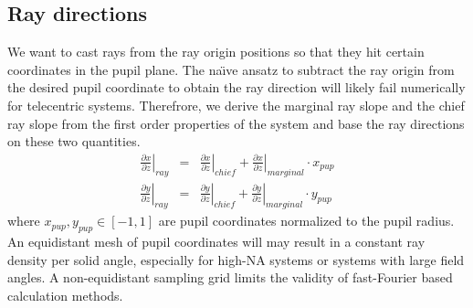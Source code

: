 \documentclass[12pt,a4paper,twoside,openright,BCOR10mm,headsepline,titlepage,abstracton,chapterprefix,final]{scrreprt}
\begin{document}
\subsection{Ray directions}
We want to cast rays from the ray origin positions so that they hit certain coordinates in the pupil plane. 
The na\"{\i}ve ansatz to subtract the ray origin from the desired pupil coordinate to obtain the ray direction will likely fail numerically for telecentric systems.
Therefrore, we derive the marginal ray slope and the chief ray slope from the first order properties of the system and base the ray directions on these two quantities.
%
\begin{eqnarray}
  \left. \frac{\partial x}{\partial z}\right|_{ray} &=& \left. \frac{\partial x}{\partial z}\right|_{chief} + \left. \frac{\partial x}{\partial z}\right|_{marginal} \cdot x_{pup} \\
  \left. \frac{\partial y}{\partial z}\right|_{ray} &=& \left. \frac{\partial y}{\partial z}\right|_{chief} + \left. \frac{\partial y}{\partial z}\right|_{marginal} \cdot y_{pup}
\end{eqnarray}
where $x_{pup}, y_{pup} \in [-1,1]$ are pupil coordinates normalized to the pupil radius. 
An equidistant mesh of pupil coordinates will may result in a constant ray density per solid angle, especially for high-NA systems or systems with large field angles.
A non-equidistant sampling grid limits the validity of fast-Fourier based calculation methods.
\end{document}
